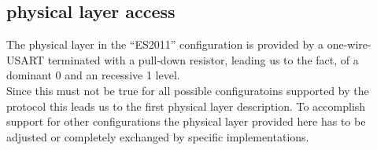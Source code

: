 \subsection{physical layer access}
\label{sec:bus:design:layer1}

The physical layer in the ``ES2011'' configuration is provided by a one-wire-USART terminated with a pull-down resistor, 
leading us to the fact, of a dominant 0 and an recessive 1 level.\\

Since this must not be true for all possible configuratoins supported by the protocol this leads
us to the first physical layer description. To accomplish support for other configurations the physical 
layer provided here has to be adjusted or completely exchanged by specific implementations.\\


